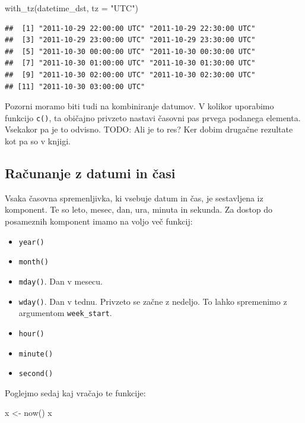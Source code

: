 \documentclass[
]{book}
\newenvironment{Shaded}{\begin{snugshade}}{\end{snugshade}}
\newcommand{\AttributeTok}[1]{\textcolor[rgb]{0.77,0.63,0.00}{#1}}
\newcommand{\FunctionTok}[1]{\textcolor[rgb]{0.00,0.00,0.00}{#1}}
\newcommand{\NormalTok}[1]{#1}
\newcommand{\OtherTok}[1]{\textcolor[rgb]{0.56,0.35,0.01}{#1}}
\newcommand{\StringTok}[1]{\textcolor[rgb]{0.31,0.60,0.02}{#1}}
\providecommand{\tightlist}{%
  \setlength{\itemsep}{0pt}\setlength{\parskip}{0pt}}
\begin{document}
\begin{Shaded}
\begin{Highlighting}[]
\FunctionTok{with\_tz}\NormalTok{(datetime\_dst, }\AttributeTok{tz =} \StringTok{"UTC"}\NormalTok{)}
\end{Highlighting}
\end{Shaded}

\begin{verbatim}
##  [1] "2011-10-29 22:00:00 UTC" "2011-10-29 22:30:00 UTC"
##  [3] "2011-10-29 23:00:00 UTC" "2011-10-29 23:30:00 UTC"
##  [5] "2011-10-30 00:00:00 UTC" "2011-10-30 00:30:00 UTC"
##  [7] "2011-10-30 01:00:00 UTC" "2011-10-30 01:30:00 UTC"
##  [9] "2011-10-30 02:00:00 UTC" "2011-10-30 02:30:00 UTC"
## [11] "2011-10-30 03:00:00 UTC"
\end{verbatim}

Pozorni moramo biti tudi na kombiniranje datumov. V kolikor uporabimo funkcijo \texttt{c()}, ta običajno privzeto nastavi časovni pas prvega podanega elementa. Vsekakor pa je to odvisno. TODO: Ali je to res? Ker dobim drugačne rezultate kot pa so v knjigi.

\hypertarget{raux10dunanje-z-datumi-in-ux10dasi}{%
\subsection{Računanje z datumi in časi}\label{raux10dunanje-z-datumi-in-ux10dasi}}

Vsaka časovna spremenljivka, ki vsebuje datum in čas, je sestavljena iz komponent. Te so leto, mesec, dan, ura, minuta in sekunda. Za dostop do posameznih komponent imamo na voljo več funkcij:

\begin{itemize}
\tightlist
\item
  \texttt{year()}
\item
  \texttt{month()}
\item
  \texttt{mday()}. Dan v mesecu.
\item
  \texttt{wday()}. Dan v tednu. Privzeto se začne z nedeljo. To lahko spremenimo z argumentom \texttt{week\_start}.
\item
  \texttt{hour()}
\item
  \texttt{minute()}
\item
  \texttt{second()}
\end{itemize}

Poglejmo sedaj kaj vračajo te funkcije:

\begin{Shaded}
\begin{Highlighting}[]
\NormalTok{x }\OtherTok{\textless{}{-}} \FunctionTok{now}\NormalTok{()}
\NormalTok{x}
\end{Highlighting}
\end{Shaded}
\end{document}
